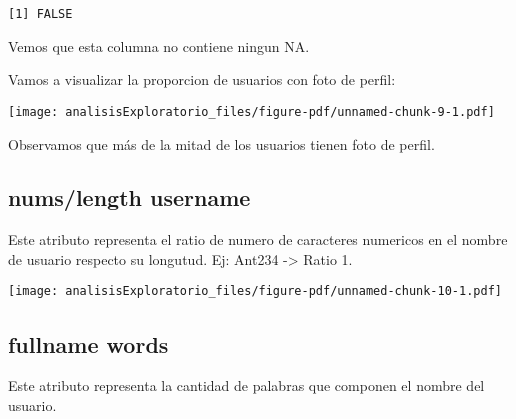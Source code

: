 \documentclass[
  letterpaper,
  DIV=11,
  numbers=noendperiod]{scrreprt}
\newenvironment{Shaded}{\begin{snugshade}}{\end{snugshade}}
\newcommand{\AttributeTok}[1]{\textcolor[rgb]{0.40,0.45,0.13}{#1}}
\newcommand{\DecValTok}[1]{\textcolor[rgb]{0.68,0.00,0.00}{#1}}
\newcommand{\FunctionTok}[1]{\textcolor[rgb]{0.28,0.35,0.67}{#1}}
\newcommand{\NormalTok}[1]{\textcolor[rgb]{0.00,0.23,0.31}{#1}}
\newcommand{\SpecialCharTok}[1]{\textcolor[rgb]{0.37,0.37,0.37}{#1}}
\newcommand{\StringTok}[1]{\textcolor[rgb]{0.13,0.47,0.30}{#1}}
\begin{document}
\begin{verbatim}
[1] FALSE
\end{verbatim}

Vemos que esta columna no contiene ningun NA.

Vamos a visualizar la proporcion de usuarios con foto de perfil:

\begin{Shaded}
\end{Shaded}

\texttt{[image: analisisExploratorio\_files/figure-pdf/unnamed-chunk-9-1.pdf]}

Observamos que más de la mitad de los usuarios tienen foto de perfil.

\subsection{nums/length username}\label{numslength-username}

Este atributo representa el ratio de numero de caracteres numericos en
el nombre de usuario respecto su longutud. Ej: Ant234 -\textgreater{}
Ratio 1.

\begin{Shaded}
\end{Shaded}

\texttt{[image: analisisExploratorio\_files/figure-pdf/unnamed-chunk-10-1.pdf]}

\subsection{fullname words}\label{fullname-words}

Este atributo representa la cantidad de palabras que componen el nombre
del usuario.

\begin{Shaded}
\end{Shaded}
\end{document}
